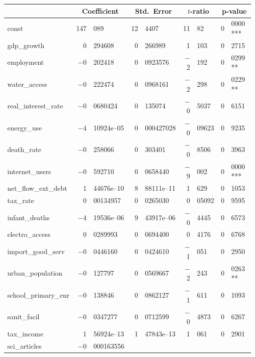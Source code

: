 \documentclass{article}
\begin{document}
\begin{table}[H]
\begin{center}
\begin{tabular}{lr@{.}lr@{.}lr@{.}lr@{.}l}
\toprule
  &
 \multicolumn{2}{c}{Coefficient} &
  \multicolumn{2}{c}{Std.\ Error} &
   \multicolumn{2}{c}{$t$-ratio} &
    \multicolumn{2}{c}{p-value} \\[1ex]
\toprule
const &
  147&089 &
    12&4407 &
      11&82 &
        0&0000 ***\\
gdp\_growth &
  0&294608 &
    0&266989 &
      1&103 &
        0&2715 \\
employment &
  $-$0&202418 &
    0&0923576 &
      $-$2&192 &
        0&0299 **\\
water\_access &
  $-$0&222474 &
    0&0968161 &
      $-$2&298 &
        0&0229 **\\
real\_interest\_rate &
  $-$0&0680424 &
    0&135074 &
      $-$0&5037 &
        0&6151 \\
energy\_use &
  $-$4&10924\textrm{e--05} &
    0&000427028 &
      $-$0&09623 &
        0&9235 \\
death\_rate &
  $-$0&258066 &
    0&303401 &
      $-$0&8506 &
        0&3963 \\
internet\_users &
  $-$0&592710 &
    0&0658440 &
      $-$9&002 &
        0&0000 ***\\
net\_flow\_ext\_debt &
  1&44676\textrm{e--10} &
    8&88111\textrm{e--11} &
      1&629 &
        0&1053 \\
tax\_rate &
  0&00134957 &
    0&0265030 &
      0&05092 &
        0&9595 \\
infant\_deaths &
  $-$4&19536\textrm{e--06} &
    9&43917\textrm{e--06} &
      $-$0&4445 &
        0&6573 \\
electro\_access &
  0&0289993 &
    0&0694400 &
      0&4176 &
        0&6768 \\
import\_good\_serv &
  $-$0&0446160 &
    0&0424610 &
      $-$1&051 &
        0&2950 \\
urban\_population &
  $-$0&127797 &
    0&0569667 &
      $-$2&243 &
        0&0263 **\\
school\_primary\_enr &
  $-$0&138846 &
    0&0862127 &
      $-$1&611 &
        0&1093 \\
sanit\_facil &
  $-$0&0347277 &
    0&0712599 &
      $-$0&4873 &
        0&6267 \\
tax\_income &
  1&56924\textrm{e--13} &
    1&47843\textrm{e--13} &
      1&061 &
        0&2901 \\
sci\_articles &
  $-$0&000163556 &

\end{tabular}
\end{center}
\end{table}
\end{document}

